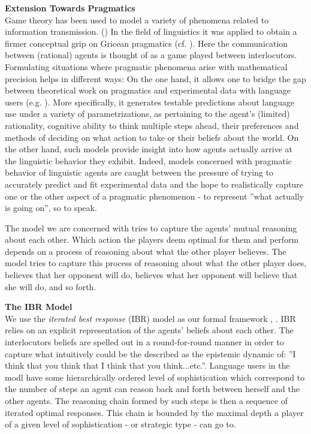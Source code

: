 \documentclass[10pt,a4paper]{article}
\begin{document}
\noindent \textbf{Extension Towards Pragmatics}\\
Game theory has been used to model a variety of phenomena related to information transmission. (\cite{spence1973job, smith1982evolution, cho1987signaling})
In the field of linguistics it was applied to obtain a firmer conceptual grip on Gricean pragmatics (cf. \cite{benz2006introduction, jager2007language}).
Here the communication between (rational) agents is thought of as a game played between interlocutors. Formulating situations where pragmatic phenomena arise with mathematical precision helps in different ways: On the one hand, it allows one to bridge the gap between theoretical work on pragmatics and experimental data with language users (e.g. \cite{frank2012predicting}). More specifically, it generates testable predictions about language use under a variety of parametrizations, as pertaining to the agent's (limited) rationality, cognitive ability to think multiple steps ahead, their preferences and methods of deciding on what action to take or their beliefs about the world. On the other hand, such models provide insight into how agents actually arrive at the linguistic behavior they exhibit.
 Indeed, models concerned with pragmatic behavior of linguistic agents are caught between the pressure of trying to accurately predict and fit experimental data and the hope to realistically capture one or the other aspect of a pragmatic phenomenon - to represent ''what actually is going on'', so to speak.

The model we are concerned with tries to capture the agents' mutual reasoning about each other. Which action the players deem optimal for them and perform depends on a process of reasoning about what the other player believes. The model tries to capture this process of reasoning about what the other player does, believes that her opponent will do, believes what her opponent will believe that she will do, and so forth.

\noindent \textbf{The IBR Model}\\
We use the \textit{iterated best response} (IBR) model as our formal framework \cite{franke2009signal}, \cite{franke2014pragmatic}. IBR relies on an explicit representation of the agents' beliefs about each other. The interlocutors beliefs are spelled out in a round-for-round manner in order to capture what intuitively could be the described as the epistemic dynamic of: ''I think that you think that I think that you think...etc.''. Language users in the modl have some hierarchically ordered level of sophistication which correspond to the number of steps an agent can reason back and forth between herself and the other agents. The reasoning chain formed by such steps is then a sequence of iterated optimal responses. This chain is bounded by the maximal depth a player of a given level of sophistication - or strategic type - can go to.
\end{document}

